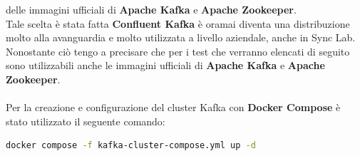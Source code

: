 delle immagini ufficiali di \textbf{Apache Kafka} e \textbf{Apache Zookeeper}. \\
Tale scelta è stata fatta \textbf{Confluent Kafka} è oramai diventa una distribuzione molto alla avanguardia e molto utilizzata 
a livello aziendale, anche in Sync Lab. \\
Nonostante ciò tengo a precisare che per i test che verranno elencati di seguito
sono utilizzabili anche le immagini ufficiali di \textbf{Apache Kafka} e \textbf{Apache Zookeeper}.\\
\\
Per la creazione e configurazione del \gls{cluster}{} Kafka con \textbf{Docker Compose} è stato utilizzato il seguente comando:
\begin{lstlisting}[language=bash]
    docker compose -f kafka-cluster-compose.yml up -d
\end{lstlisting}
